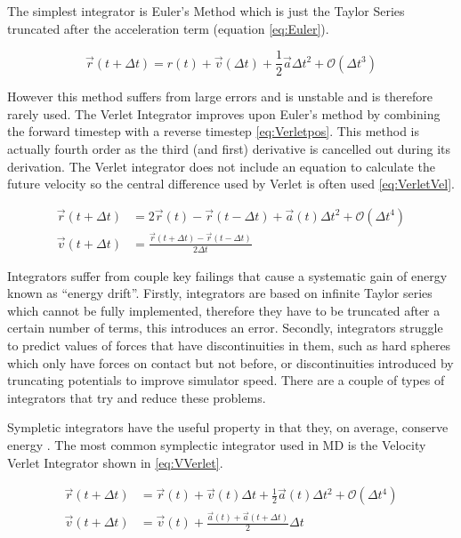 \documentclass[12pt]{UoAthesis}
\begin{document}
The simplest integrator is Euler's Method which is just the Taylor
Series truncated after the acceleration term (equation
\ref{eq:Euler}).

\begin{equation} 
  \vec{r}(t+\Delta t) = r(t) + \vec{v}(\Delta t) +
  \frac{1}{2}\vec{a}\Delta t^2 + \mathcal{O}(\Delta t^3) 
  \label{eq:Euler}
\end{equation}

However this method suffers from large errors and is unstable
\cite{Haile1997} and is therefore rarely used. The Verlet Integrator
\cite{Verlet1967} improves upon Euler's method by combining the
forward timestep with a reverse timestep \eqref{eq:Verletpos}. This
method is actually fourth order as the third (and first) derivative is
cancelled out during its derivation. The Verlet integrator does not
include an equation to calculate the future velocity so the central
difference used by Verlet is often used \eqref{eq:VerletVel}.

\begin{subequations} 
  \begin{align} 
    \vec{r}(t + \Delta t) &= 2\vec{r}(t) - \vec{r}(t - \Delta t) 
    + \vec{a}(t)\Delta t^2 + \mathcal{O}(\Delta t^4)
    \label{eq:Verletpos} \\
    \vec{v}(t+\Delta t) &= \frac{\vec{r}(t+\Delta t) -
      \vec{r}(t-\Delta t)}{2\Delta t} 
    \label{eq:VerletVel} 
  \end{align}
\end{subequations}

Integrators suffer from couple key failings that cause a systematic
gain of energy known as ``energy drift''. Firstly, integrators are
based on infinite Taylor series which cannot be fully implemented,
therefore they have to be truncated after a certain number of terms,
this introduces an error. Secondly, integrators struggle to predict
values of forces that have discontinuities in them, such as hard
spheres which only have forces on contact but not before, or
discontinuities introduced by truncating potentials to improve
simulator speed.  There are a couple of types of integrators that try
and reduce these problems.

Sympletic integrators have the useful property in that they, on
average, conserve energy \cite{Hairer2003}. The most common symplectic
integrator used in MD is the Velocity Verlet Integrator
\cite{Swope1982} shown in \eqref{eq:VVerlet}.

\begin{subequations}
\label{eq:VVerlet}
\begin{align}
 \vec{r}(t + \Delta t) &= \vec{r}(t) + \vec{v}(t) \Delta t 
 + \frac{1}{2}\vec{a}(t) \Delta t^2 + \mathcal{O}(\Delta t^4)
 \label{eq:VVerletpos} \\
 \vec{v}(t+\Delta t) &= \vec{v}(t) + \frac{\vec{a}(t) 
   + \vec{a}(t+\Delta t)}{2}\Delta t
 \label{eq:VVerletVel}
\end{align}
\end{subequations}
\end{document}
